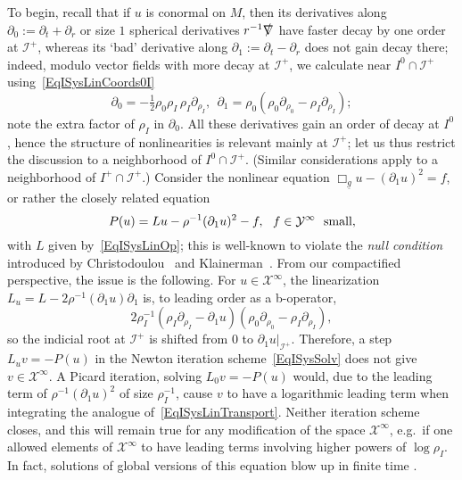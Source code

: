 \documentclass[reqno,11pt,letterpaper]{amsart}
\numberwithin{equation}{section}
\numberwithin{figure}{section}
\theoremstyle{definition}
\theoremstyle{remark}
\newcommand{\mc}{\mathcal}
\newcommand{\cX}{\mc X}
\newcommand{\cY}{\mc Y}
\newcommand{\ms}{\mathscr}
\newcommand{\scri}{\ms I}
\newcommand{\slnabla}{\slashed{\nabla}{}}
\newcommand{\pa}{\partial}
\newcommand{\tn}{\textnormal}
\newcommand{\ul}[1]{\underline{#1}{}}
\newcommand{\half}{\tfrac{1}{2}}
\begin{document}
To begin, recall that if $u$ is conormal on $M$, then its derivatives along $\pa_0:=\pa_t+\pa_r$ or size $1$ spherical derivatives $r^{-1}\slnabla$ have faster decay by one order at $\scri^+$, whereas its `bad' derivative along $\pa_1:=\pa_t-\pa_r$ does not gain decay there; indeed, modulo vector fields with more decay at $\scri^+$, we calculate near $I^0\cap\scri^+$ using~\eqref{EqISysLinCoords0I}
\[
  \pa_0 = -\half\rho_0\rho_I\,\rho_I\pa_{\rho_I},\ \ 
  \pa_1 = \rho_0(\rho_0\pa_{\rho_0}-\rho_I\pa_{\rho_I});
\]
note the extra factor of $\rho_I$ in $\pa_0$. All these derivatives gain an order of decay at $I^0$, hence the structure of nonlinearities is relevant mainly at $\scri^+$; let us thus restrict the discussion to a neighborhood of $I^0\cap\scri^+$. (Similar considerations apply to a neighborhood of $I^+\cap\scri^+$.) Consider the nonlinear equation $\Box_{\ul g}u-(\pa_1 u)^2=f$, or rather the closely related equation
\begin{equation}
\label{EqISysNullViolated}
  P(u) = L u - \rho^{-1}(\pa_1 u)^2 - f,\ \ f\in\cY^\infty\ \ \tn{small},
\end{equation}
with $L$ given by~\eqref{EqISysLinOp}; this is well-known to violate the \emph{null condition} introduced by Christodoulou~\cite{ChristodoulouGlobalSolutionsSmallData} and Klainerman~\cite{KlainermanNullCondition}. From our compactified perspective, the issue is the following. For $u\in\cX^\infty$, the linearization $L_u=L-2\rho^{-1}(\pa_1 u)\pa_1$ is, to leading order as a b-operator,
\[
  2\rho_I^{-1}(\rho_I\pa_{\rho_I}-\pa_1 u)(\rho_0\pa_{\rho_0}-\rho_I\pa_{\rho_I}),
\]
so the indicial root at $\scri^+$ is shifted from $0$ to $\pa_1 u|_{\scri^+}$. Therefore, a step $L_u v=-P(u)$ in the Newton iteration scheme~\eqref{EqISysSolv} does not give $v\in\cX^\infty$. A Picard iteration, solving $L_0 v=-P(u)$ would, due to the leading term of $\rho^{-1}(\pa_1 u)^2$ of size $\rho_I^{-1}$, cause $v$ to have a logarithmic leading term when integrating the analogue of~\eqref{EqISysLinTransport}. Neither iteration scheme closes, and this will remain true for any modification of the space $\cX^\infty$, e.g.\ if one allowed elements of $\cX^\infty$ to have leading terms involving higher powers of $\log\rho_I$. In fact, solutions of global versions of this equation blow up in finite time \cite{JohnBlowupQuasi}.
\end{document}
